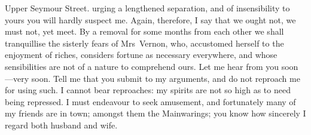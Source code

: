 \begin{mail}{Upper Seymour Street.}{}
urging a lengthened separation, and of insensibility to yours you will hardly suspect me. Again, therefore, I say that we ought not, we must not, yet meet. By a removal for some months from each other we shall tranquillise the sisterly fears of Mrs~Vernon, who, accustomed herself to the enjoyment of riches, considers fortune as necessary everywhere, and whose sensibilities are not of a nature to comprehend ours. Let me hear from you soon—very soon. Tell me that you submit to my arguments, and do not reproach me for using such. I cannot bear reproaches: my spirits are not so high as to need being repressed. I must endeavour to seek amusement, and fortunately many of my friends are in town; amongst them the Mainwarings; you know how sincerely I regard both husband and wife. 

\end{mail}